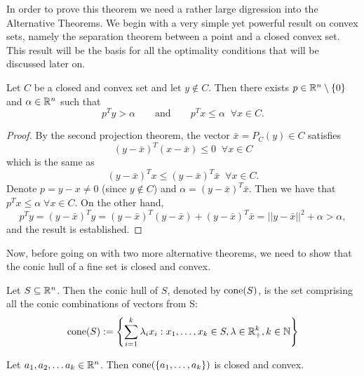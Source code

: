 \documentclass[10pt,a4paper]{article}
\begin{document}
\noindent In order to prove this theorem we need a rather large digression into the Alternative Theorems. We begin with a very simple yet powerful result on convex sets, namely the separation theorem between a point and a closed convex set. This result will be the basis for all the optimality conditions that will be discussed later on.
\begin{theorem}\label{thm:separation}
	Let $C$ be a closed and convex set and let $y\not \in C$. Then there exists $p\in \mathbb{R}^n \setminus \{0\}$ and $\alpha\in \mathbb{R}^n$ such that
	\begin{equation*}
		p^Ty>\alpha \qquad \text{and} \qquad p^Tx\leq \alpha \;\;\forall x\in C.
	\end{equation*}
\end{theorem}
\begin{proof}
By the second projection theorem, the vector $\bar{x}=P_C(y)\in C$ satisfies
\begin{equation*}
	(y-\bar{x})^T(x-\bar{x}) \leq 0 \;\; \forall x\in C
\end{equation*}
which is the same as 
\begin{equation*}
	(y-\bar{x})^T x \leq (y-\bar{x})^T \bar{x} \;\; \forall x\in C.
\end{equation*}
Denote $p=y-x\neq 0$ (since $y\not \in C$) and $\alpha= (y-\bar{x})^T \bar{x}$. Then we have that $p^Tx\leq \alpha\;\forall x\in C$. On the other hand,
\begin{equation*}
	p^Ty = (y-\bar{x})^Ty = (y-\bar{x})^T(y-\bar{x}) + (y-\bar{x})^T\bar{x} = ||y-\bar{x}||^2 + \alpha > \alpha,
\end{equation*}
and the result is established.
\end{proof}
\noindent Now, before going on with two more alternative theorems, we need to show that the conic hull of a fine set is closed and convex.
\begin{definition} Let $S\subseteq \mathbb{R}^n$. Then the conic hull of $S$, denoted by $\mathord{\mathrm{cone}}(S)$,
	is the set comprising all the conic combinations of vectors from S:
	\begin{equation*}
		\mathord{\mathrm{cone}}(S):=\left\{\sum_{i=1}^k \lambda_i x_i: x_1,\dots, x_k\in S, \lambda\in \mathbb{R}^k_+, k \in \mathbb{N}\right\}
	\end{equation*}
\end{definition}
\begin{lemma}\label{lemma:cone}
	Let $a_1, a_2, \dots a_k\in \mathbb{R}^n$. Then $\mathord{\mathrm{cone}}(\{a_1, \dots, a_k\})$ is closed and convex.
\end{lemma}
\end{document}
